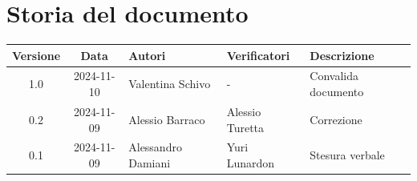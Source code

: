 \section*{Storia del documento}
\begin{tabularx}{\textwidth}{ c c p{2.75cm} p{2.75cm} X }
    \rowcolor{gray!20}\rule{0pt}{0.5cm}\textbf{Versione} & \textbf{Data} & \textbf{Autori} & \textbf{Verificatori} & \textbf{Descrizione} \\[0.7ex]
    \hline
    \rule{0pt}{0.5cm}1.0 & 2024-11-10 & Valentina Schivo & - & Convalida documento \\[0.7ex]
    \hline
    \rule{0pt}{0.5cm}0.2 & 2024-11-09 & Alessio Barraco & Alessio Turetta & Correzione \\[0.7ex]
    \hline
    \rule{0pt}{0.5cm}0.1 & 2024-11-09 & Alessandro Damiani & Yuri Lunardon & Stesura verbale\\[0.7ex]
    
\end{tabularx}